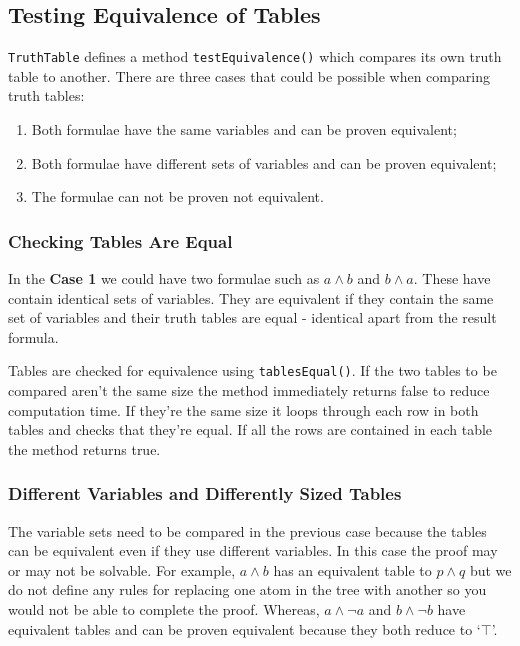 \documentclass[draft]{report}
\begin{document}
\subsection{Testing Equivalence of Tables}
\label{sub:testing_equivalence_of_tables}

{\tt TruthTable} defines a method {\tt testEquivalence()} which compares its own truth table to another. There are three cases that could be possible when comparing truth tables:

\begin{enumerate}[leftmargin=*, align=left, label=\bfseries Case \arabic*:]
\item Both formulae have the same variables and can be proven equivalent;

\item Both formulae have different sets of variables and can be proven equivalent;

\item The formulae can not be proven not equivalent.
\end{enumerate}

\subsubsection{Checking Tables Are Equal}

In the \textbf{Case 1} we could have two formulae such as $a \land b$ and $b \land a$. These have contain identical sets of variables. They are equivalent if they contain the same set of variables and their truth tables are equal - identical apart from the result formula.

Tables are checked for equivalence using {\tt tablesEqual()}. If the two tables to be compared aren't the same size the method immediately returns false to reduce computation time. If they're the same size it loops through each row in both tables and checks that they're equal. If all the rows are contained in each table the method returns true.

\subsubsection{Different Variables and Differently Sized Tables}

The variable sets need to be compared in the previous case because the tables can be equivalent even if they use different variables. In this case the proof may or may not be solvable. For example, $a \land b$ has an equivalent table to $p \land q$ but we do not define any rules for replacing one atom in the tree with another so you would not be able to complete the proof. Whereas, $a \land \lnot a$ and $b \land \lnot b$ have equivalent tables and can be proven equivalent because they both reduce to `$\top$'.
\end{document}
